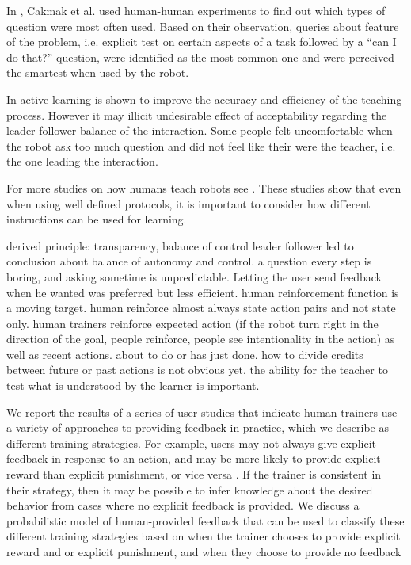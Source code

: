 In \cite{cakmak2012designing}, Cakmak et al. used human-human experiments to find out which types of question were most often used. Based on their observation, queries about feature of the problem, i.e. explicit test on certain aspects of a task followed by a ``can I do that?'' question, were identified as the most common one and were perceived the smartest when used by the robot. 

In \cite{chao2010transparent} active learning is shown to improve the accuracy and efficiency of the teaching process. However it may illicit undesirable effect of acceptability regarding the leader-follower balance of the interaction. Some people felt uncomfortable when the robot ask too much question and did not feel like their were the teacher, i.e. the one leading the interaction.


For more studies on how humans teach robots see \cite{thomaz2009learning,kaochar2011towards,knox2012humans}. These studies show that even when using well defined protocols, it is important to consider how different instructions can be used for learning. 

derived principle: \cite{thomaz2008teachable} 
transparency, balance of control leader follower
\cite{cakmak2010designing} led to conclusion about balance of autonomy and control. a question every step is boring,  and asking sometime is unpredictable. Letting the user send feedback when he wanted was preferred but less efficient.
\cite{knox2009design} human reinforcement function is a moving target. human reinforce almost always state action pairs and not state only. human trainers reinforce expected action (if the robot turn right in the direction of the goal, people reinforce, people see intentionality in the action) as well as recent actions. about to do or has just done. how to divide credits between future or past actions is not obvious yet.
\cite{kaochar2011towards} the ability for the teacher to test what is understood by the learner is important.

\cite{loftinlearning} We report the results of a series of user studies that indicate human trainers use a variety of approaches to providing feedback in practice, which we describe as different training strategies. For example, users may not always give explicit feedback in response to an action, and may be more likely to provide explicit reward than explicit punishment, or vice versa . If the trainer is consistent in their strategy, then it may be possible to infer knowledge about the desired behavior from cases where no explicit feedback is provided. We discuss a probabilistic model of human-provided feedback that can be used to classify these different training strategies based on when the trainer chooses to provide explicit reward and or explicit punishment, and when they choose to provide no feedback

